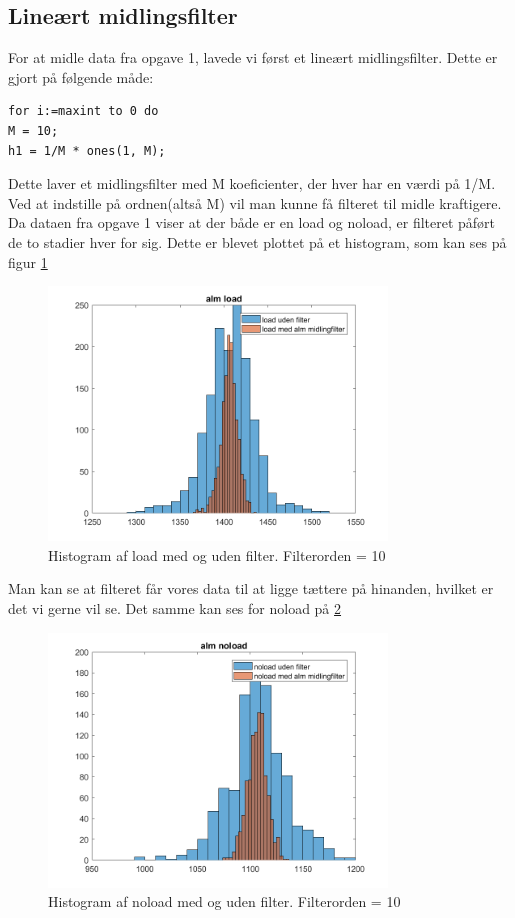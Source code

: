 \documentclass[12pt]{article}
\begin{document}
\subsection{Lineært midlingsfilter}
For at midle data fra opgave 1, lavede vi først et lineært midlingsfilter. Dette er gjort på følgende måde:

\begin{lstlisting}[frame=single]  % Start your code-block
for i:=maxint to 0 do
M = 10;
h1 = 1/M * ones(1, M);
\end{lstlisting}
Dette laver et midlingsfilter med M koeficienter, der hver har en værdi på 1/M. Ved at indstille på ordnen(altså M) vil man kunne få filteret til midle kraftigere. \\

Da dataen fra opgave 1 viser at der både er en load og noload, er filteret påført de to stadier hver for sig. Dette er blevet plottet på et histogram, som kan ses på figur \ref{fig:histogram1}

\begin{figure}[H]
	\centering
	\includegraphics[width=90mm]{Img/Histogram_load_L.png}
	\caption{Histogram af load med og uden filter. Filterorden = 10}
	\label{fig:histogram1}
\end{figure}

Man kan se at filteret får vores data til at ligge tættere på hinanden, hvilket er det vi gerne vil se. Det samme kan ses for noload på \ref{fig:histogram2}

\begin{figure}[H]
	\centering
	\includegraphics[width=90mm]{Img/Histogram_noload_L.png}
	\caption{Histogram af noload med og uden filter. Filterorden = 10}
	\label{fig:histogram2}
\end{figure}
\end{document}
